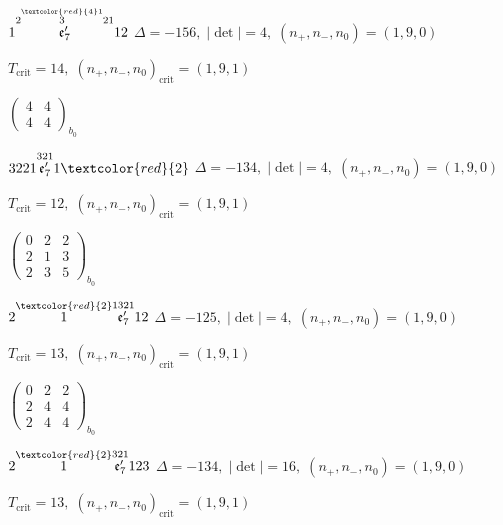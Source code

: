 \documentclass[10pt]{article}
\begin{document}
$1\overset{2\overset{\textcolor{red}{4}1}{3}21}{\mathfrak{e}_7'}12$ \quad $\Delta=-156,\; |\det|=4,\; (n_+,n_-,n_0)=(1,9,0)$

\hspace{1em}$T_{\text{crit}}=14,\; (n_+,n_-,n_0)_{\text{crit}}=(1,9,1)$

\hspace{2em}$\left(\begin{smallmatrix}4 & 4 \\ 4 & 4\end{smallmatrix}\right)_{\!b_0}$

\smallskip

$3221\overset{321}{\mathfrak{e}_7'}1\textcolor{red}{2}$ \quad $\Delta=-134,\; |\det|=4,\; (n_+,n_-,n_0)=(1,9,0)$

\hspace{1em}$T_{\text{crit}}=12,\; (n_+,n_-,n_0)_{\text{crit}}=(1,9,1)$

\hspace{2em}$\left(\begin{smallmatrix}0 & 2 & 2 \\ 2 & 1 & 3 \\ 2 & 3 & 5\end{smallmatrix}\right)_{\!b_0}$

\smallskip

$2\overset{\textcolor{red}{2}}{1}\overset{1321}{\mathfrak{e}_7'}12$ \quad $\Delta=-125,\; |\det|=4,\; (n_+,n_-,n_0)=(1,9,0)$

\hspace{1em}$T_{\text{crit}}=13,\; (n_+,n_-,n_0)_{\text{crit}}=(1,9,1)$

\hspace{2em}$\left(\begin{smallmatrix}0 & 2 & 2 \\ 2 & 4 & 4 \\ 2 & 4 & 4\end{smallmatrix}\right)_{\!b_0}$

\smallskip

$2\overset{\textcolor{red}{2}}{1}\overset{321}{\mathfrak{e}_7'}123$ \quad $\Delta=-134,\; |\det|=16,\; (n_+,n_-,n_0)=(1,9,0)$

\hspace{1em}$T_{\text{crit}}=13,\; (n_+,n_-,n_0)_{\text{crit}}=(1,9,1)$
\end{document}
